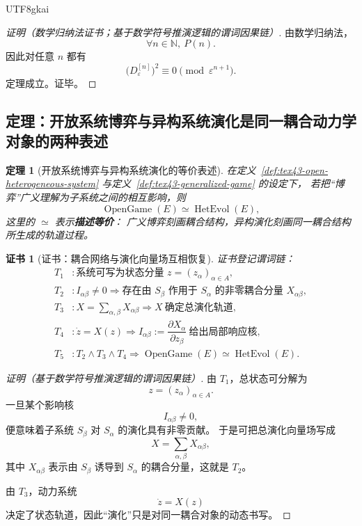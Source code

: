 \documentclass[12pt]{article}
\newtheorem{theorem}{定理}[section]
\newtheorem{Certificate}{证书}[section]
\newcommand{\NN}{\mathbb{N}}
\newcommand{\OpenGame}{\operatorname{OpenGame}}
\newcommand{\HetEvol}{\operatorname{HetEvol}}
\begin{document}
\begin{CJK*}{UTF8}{gkai}
\begin{proof}[证明（数学归纳法证书；基于数学符号推演逻辑的谓词因果链）]
由数学归纳法，
\[
  \forall n\in\NN,\ P(n).
\]
因此对任意 $n$ 都有
\[
  \bigl(D_{\varepsilon}^{[n]}\bigr)^2
  \equiv 0
  \pmod{\varepsilon^{n+1}}.
\]
定理成立。证毕。
\end{proof}

\subsection{定理：开放系统博弈与异构系统演化是同一耦合动力学对象的两种表述}
\label{subsec:tex43-open-game}

\begin{theorem}[开放系统博弈与异构系统演化的等价表述]
\label{thm:tex43-open-game-evolution}
在定义~\ref{def:tex43-open-heterogeneous-system} 与定义~\ref{def:tex43-generalized-game} 的设定下，
若把“博弈”广义理解为子系统之间的相互影响，则
\[
  \OpenGame(E)\simeq \HetEvol(E),
\]
这里的 $\simeq$ 表示\textbf{描述等价}：
广义博弈刻画耦合结构，异构演化刻画同一耦合结构所生成的轨道过程。
\end{theorem}

\begin{Certificate}[证书：耦合网络与演化向量场互相恢复]
\label{cert:tex43-open-game-evolution}
证书登记谓词链：
\[
\begin{aligned}
  T_1 &: \text{系统可写为状态分量 }z=(z_\alpha)_{\alpha\in A},\\
  T_2 &: I_{\alpha\beta}\neq 0 \Rightarrow \text{存在由 }S_\beta\text{ 作用于 }S_\alpha\text{ 的非零耦合分量 }X_{\alpha\beta},\\
  T_3 &: X=\sum_{\alpha,\beta}X_{\alpha\beta}\Rightarrow X\ \text{确定总演化轨道},\\
  T_4 &: \dot z=X(z)\Rightarrow I_{\alpha\beta}:=\dfrac{\partial X_\alpha}{\partial z_\beta}\ \text{给出局部响应核},\\
  T_5 &: T_2\wedge T_3\wedge T_4\Rightarrow \OpenGame(E)\simeq \HetEvol(E).
\end{aligned}
\]
\end{Certificate}

\begin{proof}[证明（基于数学符号推演逻辑的谓词因果链）]
由 $T_1$，总状态可分解为
\[
  z=(z_\alpha)_{\alpha\in A}.
\]
一旦某个影响核
\[
  I_{\alpha\beta}\neq 0,
\]
便意味着子系统 $S_\beta$ 对 $S_\alpha$ 的演化具有非零贡献。
于是可把总演化向量场写成
\[
  X=\sum_{\alpha,\beta}X_{\alpha\beta},
\]
其中 $X_{\alpha\beta}$ 表示由 $S_\beta$ 诱导到 $S_\alpha$ 的耦合分量，这就是 $T_2$。

由 $T_3$，动力系统
\[
  \dot z = X(z)
\]
决定了状态轨道，因此“演化”只是对同一耦合对象的动态书写。


\end{proof}
\end{CJK*}
\end{document}

